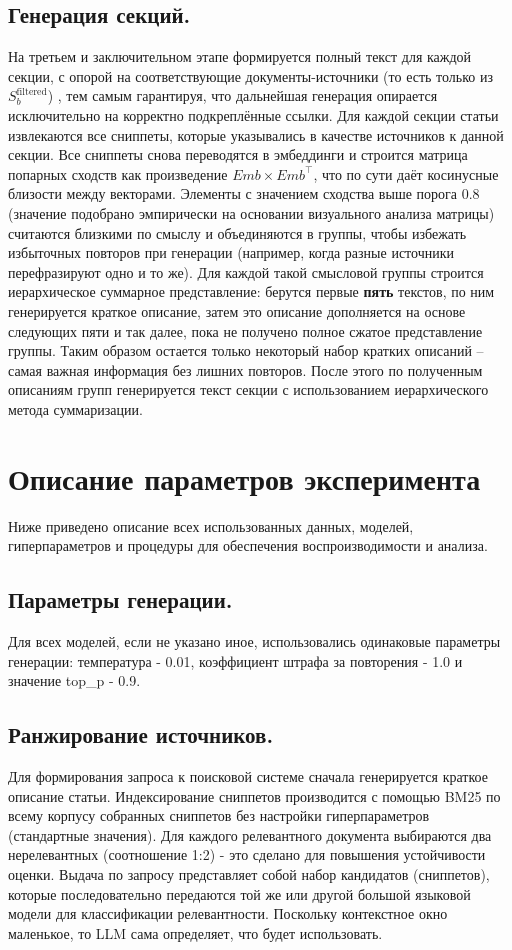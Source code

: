 \documentclass{article}
\theoremstyle{definition}
\theoremstyle{plain}
\begin{document}
\subsection*{Генерация секций.}
На третьем и заключительном этапе формируется полный текст для каждой секции, с опорой на соответствующие документы-источники (то есть только из \(S_b^{\mathrm{filtered}}\))
, тем самым гарантируя, что дальнейшая генерация опирается исключительно на корректно подкреплённые ссылки. 
Для каждой секции статьи извлекаются все сниппеты, которые указывались в качестве источников к данной секции. 
Все сниппеты снова переводятся в эмбеддинги и строится матрица попарных сходств как произведение \(Emb \times Emb^\top\), что по сути даёт косинусные близости между векторами. 
Элементы с значением сходства выше порога 0.8 (значение подобрано эмпирически на основании визуального анализа матрицы) считаются близкими по смыслу и объединяются в группы, 
чтобы избежать избыточных повторов при генерации (например, когда разные источники перефразируют одно и то же). 
Для каждой такой смысловой группы строится иерархическое суммарное представление: 
берутся первые \textbf{пять} текстов, по ним генерируется краткое описание, затем это описание дополняется на основе следующих пяти и так далее, пока не получено полное сжатое представление группы.
Таким образом остается только некоторый набор кратких описаний – самая важная информация без лишних повторов.
После этого по полученным описаниям групп генерируется текст секции с использованием иерархического метода суммаризации.

\section*{Описание параметров эксперимента}
Ниже приведено описание всех использованных данных, моделей, гиперпараметров и процедуры для обеспечения воспроизводимости и анализа.

\subsection*{Параметры генерации.}
Для всех моделей, если не указано иное, использовались одинаковые параметры генерации: температура - 0.01, коэффициент штрафа за повторения - 1.0 и значение top\_p - 0.9.

\subsection*{Ранжирование источников.}
Для формирования запроса к поисковой системе сначала генерируется краткое описание статьи. 
Индексирование сниппетов производится с помощью BM25 по всему корпусу собранных сниппетов без настройки гиперпараметров (стандартные значения).
Для каждого релевантного документа выбираются два нерелевантных (соотношение 1:2) - это сделано для повышения устойчивости оценки.
Выдача по запросу представляет собой набор кандидатов (сниппетов), которые последовательно передаются той же или другой большой языковой модели для классификации релевантности.
Поскольку контекстное окно маленькое, то LLM сама определяет, что будет использовать.
\end{document}
